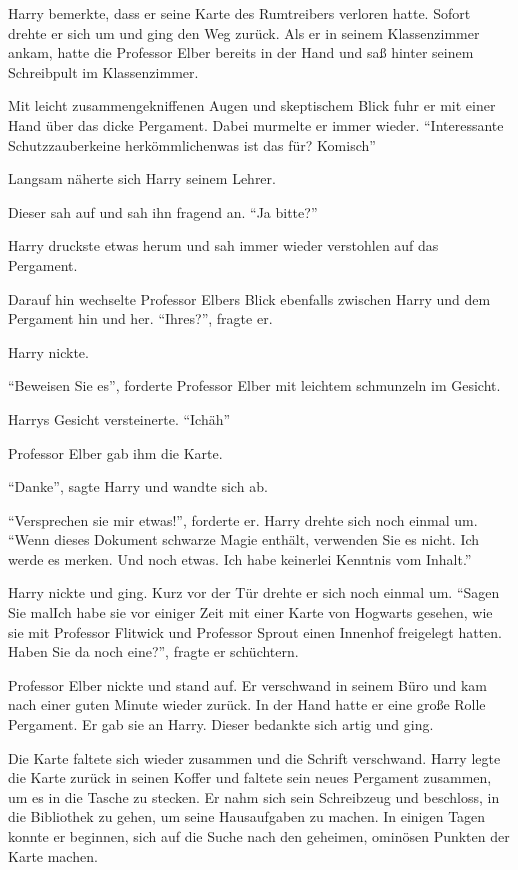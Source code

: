\begin{rueckblick}
Harry bemerkte, dass er seine Karte des Rumtreibers verloren hatte. Sofort drehte er sich um und ging den Weg zurück. Als er in seinem Klassenzimmer ankam, hatte die Professor Elber bereits in der Hand und saß hinter seinem Schreibpult im Klassenzimmer.

Mit leicht zusammengekniffenen Augen und skeptischem Blick fuhr er mit einer Hand über das dicke Pergament. Dabei murmelte er immer wieder. \enquote{Interessante Schutzzauber\abs keine herkömmlichen\abs was ist das für\abs? Komisch\abs}

Langsam näherte sich Harry seinem Lehrer.

Dieser sah auf und sah ihn fragend an. \enquote{Ja bitte?}

Harry druckste etwas herum und sah immer wieder verstohlen auf das Pergament.

Darauf hin wechselte Professor Elbers Blick ebenfalls zwischen Harry und dem Pergament hin und her. \enquote{Ihres?}, fragte er.

Harry nickte.

\enquote{Beweisen Sie es}, forderte Professor Elber mit leichtem schmunzeln im Gesicht.

Harrys Gesicht versteinerte. \enquote{Ich\abs äh\abs}

Professor Elber gab ihm die Karte.

\enquote{Danke}, sagte Harry und wandte sich ab.

\enquote{Versprechen sie mir etwas!}, forderte er. Harry drehte sich noch einmal um. \enquote{Wenn dieses Dokument schwarze Magie enthält, verwenden Sie es nicht. Ich werde es merken. \gst Und noch etwas. Ich habe keinerlei Kenntnis vom Inhalt.}

Harry nickte und ging. Kurz vor der Tür drehte er sich noch einmal um. \enquote{Sagen Sie mal\abs Ich habe sie vor einiger Zeit mit einer Karte von Hogwarts gesehen, wie sie mit Professor Flitwick und Professor Sprout einen Innenhof freigelegt hatten. Haben Sie da noch eine?}, fragte er schüchtern.

Professor Elber nickte und stand auf. Er verschwand in seinem Büro und kam nach einer guten Minute wieder zurück. In der Hand hatte er eine große Rolle Pergament. Er gab sie an Harry. Dieser bedankte sich artig und ging.
\end{rueckblick}

Die Karte faltete sich wieder zusammen und die Schrift verschwand. Harry legte die Karte zurück in seinen Koffer und faltete sein neues Pergament zusammen, um es in die Tasche zu stecken. Er nahm sich sein Schreibzeug und beschloss, in die Bibliothek zu gehen, um seine Hausaufgaben zu machen. In einigen Tagen konnte er beginnen, sich auf die Suche nach den geheimen, ominösen Punkten der Karte machen.

